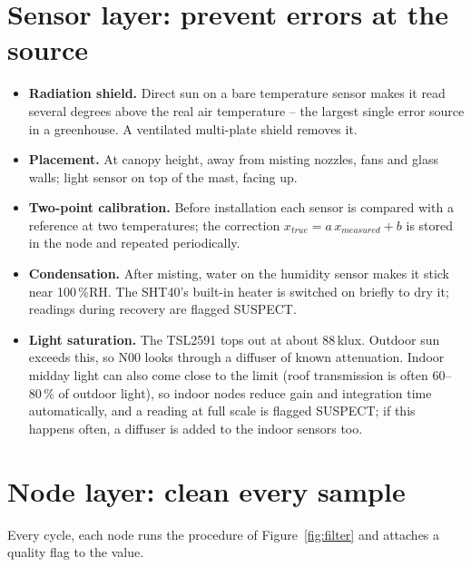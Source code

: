 \documentclass[11pt,a4paper]{report}
\begin{document}
\section{Sensor layer: prevent errors at the source}
\begin{itemize}
  \item \textbf{Radiation shield.} Direct sun on a bare temperature sensor makes it read several degrees above the real air temperature -- the largest single error source in a greenhouse. A ventilated multi-plate shield removes it.
  \item \textbf{Placement.} At canopy height, away from misting nozzles, fans and glass walls; light sensor on top of the mast, facing up.
  \item \textbf{Two-point calibration.} Before installation each sensor is compared with a reference at two temperatures; the correction $x_{true} = a\,x_{measured} + b$ is stored in the node and repeated periodically.
  \item \textbf{Condensation.} After misting, water on the humidity sensor makes it stick near 100\,\%RH. The SHT40's built-in heater is switched on briefly to dry it; readings during recovery are flagged SUSPECT.
  \item \textbf{Light saturation.} The TSL2591 tops out at about 88\,klux. Outdoor sun exceeds this, so N00 looks through a diffuser of known attenuation. Indoor midday light can also come close to the limit (roof transmission is often 60--80\,\% of outdoor light), so indoor nodes reduce gain and integration time automatically, and a reading at full scale is flagged SUSPECT; if this happens often, a diffuser is added to the indoor sensors too.
\end{itemize}

\section{Node layer: clean every sample}
Every cycle, each node runs the procedure of Figure~\ref{fig:filter} and attaches a quality flag to the value.
\end{document}
